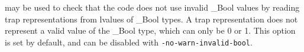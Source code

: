 \begin{description}
\item {} may be used to check that the code
  does not use invalid \_Bool values by reading trap representations
  from lvalues of \_Bool types. A trap representation does not represent
  a valid value of the \_Bool type, which can only be 0 or 1.
  This option is set by default, and can be disabled with
  \texttt{-no-warn-invalid-bool}.
\end{description}

